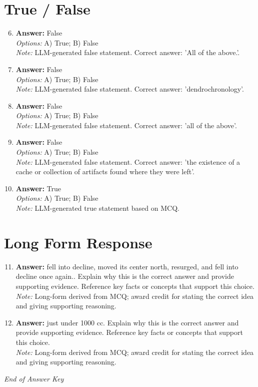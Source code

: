 \documentclass[12pt]{article}
\begin{document}
\section*{True / False}
\begin{enumerate}[label=\arabic*.]
\setcounter{enumi}{5}
\item \textbf{Answer:} False
\\ \textit{Options:} A) True; B) False
\\ \textit{Note:} LLM-generated false statement. Correct answer: 'All of the above.'.
\item \textbf{Answer:} False
\\ \textit{Options:} A) True; B) False
\\ \textit{Note:} LLM-generated false statement. Correct answer: 'dendrochronology'.
\item \textbf{Answer:} False
\\ \textit{Options:} A) True; B) False
\\ \textit{Note:} LLM-generated false statement. Correct answer: 'all of the above'.
\item \textbf{Answer:} False
\\ \textit{Options:} A) True; B) False
\\ \textit{Note:} LLM-generated false statement. Correct answer: 'the existence of a cache or collection of artifacts found where they were left'.
\item \textbf{Answer:} True
\\ \textit{Options:} A) True; B) False
\\ \textit{Note:} LLM-generated true statement based on MCQ.
\end{enumerate}

\section*{Long Form Response}
\begin{enumerate}[label=\arabic*.]
\setcounter{enumi}{10}
\item \textbf{Answer:} fell into decline, moved its center north, resurged, and fell into decline once again.. Explain why this is the correct answer and provide supporting evidence. Reference key facts or concepts that support this choice.
\\ \textit{Note:} Long-form derived from MCQ; award credit for stating the correct idea and giving supporting reasoning.
\item \textbf{Answer:} just under 1000 cc. Explain why this is the correct answer and provide supporting evidence. Reference key facts or concepts that support this choice.
\\ \textit{Note:} Long-form derived from MCQ; award credit for stating the correct idea and giving supporting reasoning.
\end{enumerate}

\vfill
\noindent\textit{End of Answer Key}
\end{document}
